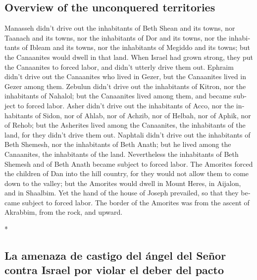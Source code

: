 \begin{paracol}{2}
\begin{otherlanguage}{english}
\hypertarget{overview-of-the-unconquered-territories}{%
\subsection{Overview of the unconquered
territories}\label{overview-of-the-unconquered-territories}}

 Manasseh didn't drive out the inhabitants of Beth Shean
and its towns, nor Taanach and its towns, nor the inhabitants of Dor and
its towns, nor the inhabitants of Ibleam and its towns, nor the
inhabitants of Megiddo and its towns; but the Canaanites would dwell in
that land.  When Israel had grown strong, they put the
Canaanites to forced labor, and didn't utterly drive them out.
 Ephraim didn't drive out the Canaanites who lived in
Gezer, but the Canaanites lived in Gezer among them. 
Zebulun didn't drive out the inhabitants of Kitron, nor the inhabitants
of Nahalol; but the Canaanites lived among them, and became subject to
forced labor.  Asher didn't drive out the inhabitants of
Acco, nor the inhabitants of Sidon, nor of Ahlab, nor of Achzib, nor of
Helbah, nor of Aphik, nor of Rehob;  but the Asherites
lived among the Canaanites, the inhabitants of the land, for they didn't
drive them out.  Naphtali didn't drive out the
inhabitants of Beth Shemesh, nor the inhabitants of Beth Anath; but he
lived among the Canaanites, the inhabitants of the land. Nevertheless
the inhabitants of Beth Shemesh and of Beth Anath became subject to
forced labor.  The Amorites forced the children of Dan
into the hill country, for they would not allow them to come down to the
valley;  but the Amorites would dwell in Mount Heres, in
Aijalon, and in Shaalbim. Yet the hand of the house of Joseph prevailed,
so that they became subject to forced labor.  The border
of the Amorites was from the ascent of Akrabbim, from the rock, and
upward.

\end{otherlanguage}

\switchcolumn[0]*

\hypertarget{la-amenaza-de-castigo-del-uxe1ngel-del-seuxf1or-contra-israel-por-violar-el-deber-del-pacto}{%
\subsection{La amenaza de castigo del ángel del Señor contra Israel por
violar el deber del
pacto}\label{la-amenaza-de-castigo-del-uxe1ngel-del-seuxf1or-contra-israel-por-violar-el-deber-del-pacto}}


\end{paracol}
